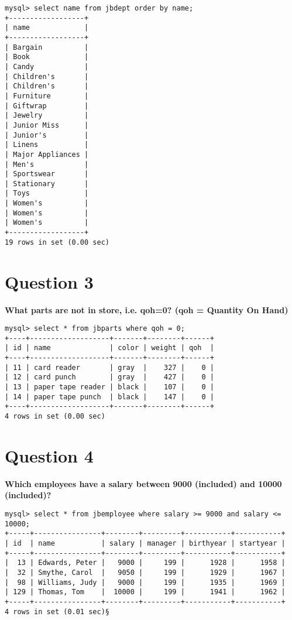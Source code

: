 \documentclass{article}
\begin{document}
\begin{lstlisting}
mysql> select name from jbdept order by name;
+------------------+
| name             |
+------------------+
| Bargain          |
| Book             |
| Candy            |
| Children's       |
| Children's       |
| Furniture        |
| Giftwrap         |
| Jewelry          |
| Junior Miss      |
| Junior's         |
| Linens           |
| Major Appliances |
| Men's            |
| Sportswear       |
| Stationary       |
| Toys             |
| Women's          |
| Women's          |
| Women's          |
+------------------+
19 rows in set (0.00 sec)
\end{lstlisting}

\section*{Question 3}
\textbf{What parts are not in store, i.e. qoh=0? (qoh = Quantity On Hand)}

\begin{lstlisting}
mysql> select * from jbparts where qoh = 0;
+----+-------------------+-------+--------+------+
| id | name              | color | weight | qoh  |
+----+-------------------+-------+--------+------+
| 11 | card reader       | gray  |    327 |    0 |
| 12 | card punch        | gray  |    427 |    0 |
| 13 | paper tape reader | black |    107 |    0 |
| 14 | paper tape punch  | black |    147 |    0 |
+----+-------------------+-------+--------+------+
4 rows in set (0.00 sec)
\end{lstlisting}

\pagebreak

\section*{Question 4}
\textbf{Which employees have a salary between 9000 (included) and 10000 (included)?}

\begin{lstlisting}
mysql> select * from jbemployee where salary >= 9000 and salary <= 10000;
+-----+----------------+--------+---------+-----------+-----------+
| id  | name           | salary | manager | birthyear | startyear |
+-----+----------------+--------+---------+-----------+-----------+
|  13 | Edwards, Peter |   9000 |     199 |      1928 |      1958 |
|  32 | Smythe, Carol  |   9050 |     199 |      1929 |      1967 |
|  98 | Williams, Judy |   9000 |     199 |      1935 |      1969 |
| 129 | Thomas, Tom    |  10000 |     199 |      1941 |      1962 |
+-----+----------------+--------+---------+-----------+-----------+
4 rows in set (0.01 sec)§
\end{lstlisting}
\end{document}
